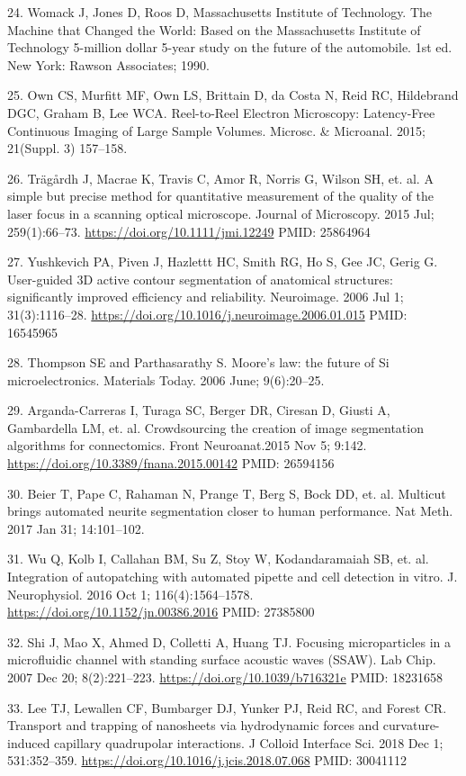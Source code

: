 \documentclass{article}
\begin{document}
\begin{hangpars}
24. Womack J, Jones D, Roos D, Massachusetts Institute of Technology. The Machine that Changed the World: Based on the Massachusetts Institute of Technology 5-million dollar 5-year study on the future of the automobile. 1st ed. New York: Rawson Associates; 1990.

25. Own CS, Murfitt MF, Own LS, Brittain D, da Costa N, Reid RC, Hildebrand DGC, Graham B, Lee WCA. Reel-to-Reel Electron Microscopy: Latency-Free Continuous Imaging of Large Sample Volumes. Microsc. \& Microanal. 2015; 21(Suppl. 3) 157–158.

26. Trägårdh J, Macrae K, Travis C, Amor R, Norris G, Wilson SH, et. al. A simple but precise method for quantitative measurement of the quality of the laser focus in a scanning optical microscope. Journal of Microscopy. 2015 Jul; 259(1):66–73. \url{https://doi.org/10.1111/jmi.12249} PMID: 25864964

27. Yushkevich PA, Piven J, Hazlettt HC, Smith RG, Ho S, Gee JC, Gerig G. User-guided 3D active contour segmentation of anatomical structures: significantly improved efficiency and reliability. Neuroimage. 2006 Jul 1; 31(3):1116–28. \url{https://doi.org/10.1016/j.neuroimage.2006.01.015} PMID: 16545965

28. Thompson SE and Parthasarathy S. Moore’s law: the future of Si microelectronics. Materials Today. 2006 June; 9(6):20–25.

29. Arganda-Carreras I, Turaga SC, Berger DR, Ciresan D, Giusti A, Gambardella LM, et. al. Crowdsourcing the creation of image segmentation algorithms for connectomics. Front Neuroanat.2015 Nov 5; 9:142. \url{https://doi.org/10.3389/fnana.2015.00142} PMID: 26594156

30. Beier T, Pape C, Rahaman N, Prange T, Berg S, Bock DD, et. al. Multicut brings automated neurite segmentation closer to human performance. Nat Meth. 2017 Jan 31; 14:101–102.

31. Wu Q, Kolb I, Callahan BM, Su Z, Stoy W, Kodandaramaiah SB, et. al. Integration of autopatching with automated pipette and cell detection in vitro. J. Neurophysiol. 2016 Oct 1; 116(4):1564–1578. \url{https://doi.org/10.1152/jn.00386.2016} PMID: 27385800

32. Shi J, Mao X, Ahmed D, Colletti A, Huang TJ. Focusing microparticles in a microfluidic channel with standing surface acoustic waves (SSAW). Lab Chip. 2007 Dec 20; 8(2):221–223. \url{https://doi.org/10.1039/b716321e} PMID: 18231658

33. Lee TJ, Lewallen CF, Bumbarger DJ, Yunker PJ, Reid RC, and Forest CR. Transport and trapping of nanosheets via hydrodynamic forces and curvature-induced capillary quadrupolar interactions. J Colloid Interface Sci. 2018 Dec 1; 531:352–359. \url{https://doi.org/10.1016/j.jcis.2018.07.068} PMID: 30041112


\end{hangpars}
\end{document}
